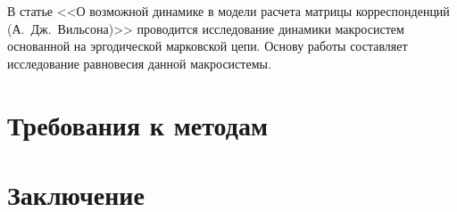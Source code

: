 В статье <<О возможной динамике в модели расчета матрицы корреспонденций (А.~Дж.~Вильсона)>>\cite{bib:24} 
проводится исследование динамики макросистем основанной на эргодической марковской цепи. Основу работы 
составляет исследование равновесия данной макросистемы.



\section{Требования к методам}
\section{Заключение}